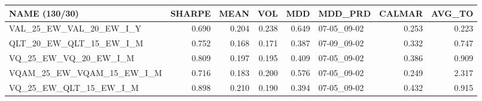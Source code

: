 \begin{tabular}{lrrrrlrr}
\toprule
NAME (130/30) & SHARPE & MEAN & VOL & MDD & MDD\_PRD & CALMAR & AVG\_TO \\
\midrule
VAL\_25\_EW\_VAL\_20\_EW\_I\_Y & 0.690 & 0.204 & 0.238 & 0.649 & 07-05\_09-02 & 0.253 & 0.223 \\
QLT\_20\_EW\_QLT\_15\_EW\_I\_M & 0.752 & 0.168 & 0.171 & 0.387 & 07-09\_09-02 & 0.332 & 0.747 \\
VQ\_25\_EW\_VQ\_20\_EW\_I\_M & 0.809 & 0.197 & 0.195 & 0.409 & 07-05\_09-02 & 0.386 & 0.909 \\
VQAM\_25\_EW\_VQAM\_15\_EW\_I\_M & 0.716 & 0.183 & 0.200 & 0.576 & 07-05\_09-02 & 0.249 & 2.317 \\
VQ\_25\_EW\_QLT\_15\_EW\_I\_M & 0.898 & 0.210 & 0.190 & 0.394 & 07-05\_09-02 & 0.432 & 0.915 \\
\bottomrule
\end{tabular}
